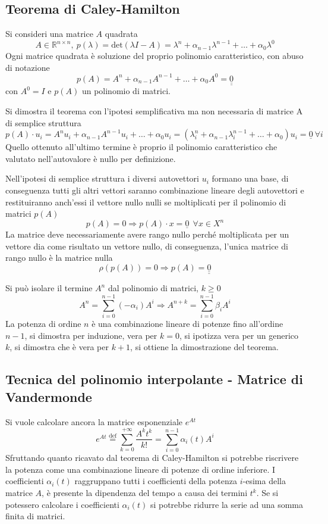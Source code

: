 \subsection{Teorema di Caley-Hamilton}
Si consideri una matrice $A$ quadrata
$$
A\in\mathbb{R}^{n\times n},\ p(\lambda) = \text{det}(\lambda I-A) = \lambda^n +
\alpha_{n-1}\lambda^{n-1} + \ldots + \alpha_0 \lambda^0
$$
Ogni matrice quadrata è soluzione del proprio polinomio caratteristico, con
abuso di notazione
$$
p(A) = A^n + \alpha_{n-1}A^{n-1}+ \ldots + \alpha_0 A^0 =
\underline{\underline{0}}
$$
con $A^0 = I$ e $p(A)$ un polinomio di matrici.

Si dimostra il teorema con l'ipotesi semplificativa ma non necessaria di
matrice A di semplice struttura
$$
p(A)\cdot u_i = A^nu_i + \alpha_{n-1}A^{n-1}u_i + \ldots + \alpha_0 u_i =
(\lambda_i^n+\alpha_{n-1}\lambda_i^{n-1}+\ldots + \alpha_0)u_i = \underline{0}\
\forall i
$$
Quello ottenuto all'ultimo termine è proprio il polinomio caratteristico che
valutato nell'autovalore è nullo per definizione.

Nell'ipotesi di semplice struttura i diversi autovettori $u_i$ formano una
base, di conseguenza tutti gli altri vettori saranno combinazione lineare degli
autovettori e restituiranno anch'essi il vettore nullo nulli se moltiplicati
per il polinomio di matrici $p(A)$
$$
p(A) = 0 \Rightarrow p(A)\cdot x = \underline{0} \ \ \forall x\in X^n
$$
La matrice deve necessariamente avere rango nullo perché moltiplicata per un
vettore dia come risultato un vettore nullo, di conseguenza, l'unica matrice di
rango nullo è la matrice nulla
$$
\rho(p(A))=0 \Rightarrow p(A) = \underline{\underline{0}}
$$

Si può isolare il termine $A^n$ dal polinomio di matrici, $k\geq 0$
$$
A^n = \sum_{i=0}^{n-1}(-\alpha_i)A^i \Rightarrow A^{n+k} =
\sum_{i=0}^{n-1}\beta_iA^i
$$
La potenza di ordine $n$ è una combinazione lineare di potenze fino all'ordine
$n-1$, si dimostra per induzione, vera per $k=0$, si ipotizza vera per un
generico $k$, si dimostra che è vera per $k+1$, si ottiene la dimostrazione del
teorema.

\subsection{Tecnica del polinomio interpolante - Matrice di Vandermonde}
Si vuole calcolare ancora la matrice esponenziale $e^{At}$
\begin{equation}
e^{At} \stackrel{\text{def}}{=} \sum_{k=0}^{+\infty} \frac{A^kt^k}{k!} =
\sum_{i=0}^{n-1} \alpha_i(t)A^i
\label{eq.:esponenziale_polinomio_interpolante}
\end{equation}
Sfruttando quanto ricavato dal teorema di Caley-Hamilton si potrebbe riscrivere
la potenza come una combinazione lineare di potenze di ordine inferiore.
I coefficienti $\alpha_i(t)$ raggruppano tutti i coefficienti della potenza
$i$-esima della matrice $A$, è presente la dipendenza del tempo a causa dei
termini $t^k$.
Se si potessero calcolare i coefficienti $\alpha_i(t)$ si potrebbe ridurre la
serie ad una somma finita di matrici.

